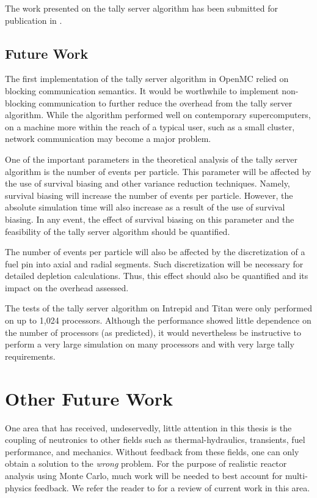 The work presented on the tally server algorithm has been submitted for
publication in \cite{jcp-romano-2013}.

\subsection{Future Work}

The first implementation of the tally server algorithm in OpenMC relied on
blocking communication semantics. It would be worthwhile to implement
non-blocking communication to further reduce the overhead from the tally server
algorithm. While the algorithm performed well on contemporary supercomputers, on
a machine more within the reach of a typical user, such as a small cluster,
network communication may become a major problem.

One of the important parameters in the theoretical analysis of the tally server
algorithm is the number of events per particle. This parameter will be affected
by the use of survival biasing and other variance reduction techniques. Namely,
survival biasing will increase the number of events per particle. However, the
absolute simulation time will also increase as a result of the use of survival
biasing. In any event, the effect of survival biasing on this parameter and the
feasibility of the tally server algorithm should be quantified.

The number of events per particle will also be affected by the discretization of
a fuel pin into axial and radial segments. Such discretization will be necessary
for detailed depletion calculations. Thus, this effect should also be quantified
and its impact on the overhead assessed.

The tests of the tally server algorithm on Intrepid and Titan were only
performed on up to 1,024 processors. Although the performance showed little
dependence on the number of processors (as predicted), it would nevertheless be
instructive to perform a very large simulation on many processors and with very
large tally requirements.

\section{Other Future Work}

One area that has received, undeservedly, little attention in this thesis is the
coupling of neutronics to other fields such as thermal-hydraulics, transients,
fuel performance, and mechanics. Without feedback from these fields, one can
only obtain a solution to the \emph{wrong} problem. For the purpose of realistic
reactor analysis using Monte Carlo, much work will be needed to best account for
multi-physics feedback. We refer the reader to \cite{net-martin-2012} for a
review of current work in this area.

